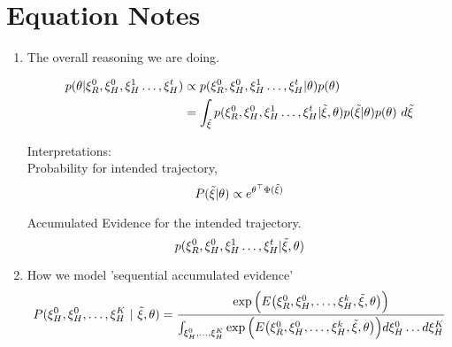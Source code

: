 \newpage

\section{Equation Notes}
\begin{enumerate}
\item The overall reasoning we are doing.
    
\begin{eqnarray}
\begin{aligned}
p(\theta|\xi_R^0,\xi_H^0, \xi_H^1 \ldots, \xi_H^{t}) &\propto p(\xi_R^0,\xi_H^0, \xi_H^1 \ldots, \xi_H^{t}| \theta) p(\theta) \\
&= \int_{\Tilde{\xi}} p(\xi_R^0,\xi_H^0, \xi_H^1 \ldots, \xi_H^{t}|\Tilde{\xi}, \theta)p(\Tilde{\xi} | \theta) p(\theta) ~d \Tilde{\xi}
\end{aligned}
\end{eqnarray}

Interpretations:\\
Probability for intended trajectory,
\begin{equation}
P(\Tilde{\xi} | \theta) \propto e^{\theta^\top\Phi(\Tilde{\xi})}
\end{equation}

Accumulated Evidence for the intended trajectory.
\begin{equation}
    p(\xi_R^0,\xi_H^0, \xi_H^1 \ldots, \xi_H^{t}|\Tilde{\xi}, \theta)
\end{equation}

\item How we model 'sequential accumulated evidence'
\begin{equation}
    P(\xi_H^0, \xi_H^0, \ldots, \xi_H^{K} ~|~ \Tilde{\xi}, \theta) = \frac{\exp\Big(E\big(\xi_R^0,\xi_H^0, \ldots, \xi_H^{k}, \Tilde{\xi}, \theta\big)\Big)}{\int_{ \xi_H^0, \ldots, \xi_H^{K}}\exp\Big(E\big(\xi_R^0,\xi_H^0, \ldots, \xi_H^{k}, \Tilde{\xi}, \theta\big)\Big)d\xi_H^0 \ldots d\xi_H^{K}}
\end{equation}



\end{enumerate}
